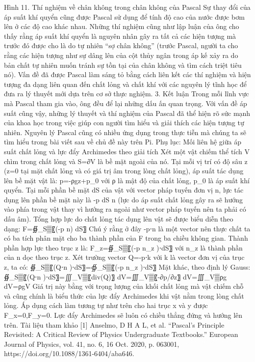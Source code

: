 \begin{multicols}{2}
	Hình 11. Thí nghiệm về chân không trong chân không của Pascal
	Sự thay đổi của áp suất khí quyển cũng được Pascal sử dụng để tính độ cao của nước được bơm lên ở các độ cao khác nhau. Những thí nghiệm cũng như lập luận của ông cho thấy rằng áp suất khí quyển là nguyên nhân gây ra tất cả các hiện tượng mà trước đó được cho là do tự nhiên “sợ chân không” (trước Pascal, người ta cho rằng các hiện tượng như sự dâng lên của cột thủy ngân trong áp kế xảy ra do bản chất tự nhiên muốn tránh sự tồn tại của chân không và tìm cách triệt tiêu nó). Vấn đề đã được Pascal làm sáng tỏ bằng cách liên kết các thí nghiệm và hiện tượng đa dạng liên quan đến chất lỏng và chất khí với các nguyên lý tĩnh học để đưa ra lý  thuyết mới dựa trên cơ sở thực nghiệm.
	3. Kết luận
	Trong mỗi lĩnh vực mà Pascal tham gia vào, ông đều để lại những dấu ấn quan trọng. Với vấn đề áp suất cũng vậy, những lý  thuyết và thí nghiệm của Pascal đã thể hiện rõ sức mạnh của khoa học trong việc giúp con người tìm hiểu và giải thích các hiện tượng tự nhiên. Nguyên lý Pascal cũng có nhiều ứng dụng trong thực tiễn mà chúng ta sẽ tìm hiểu trong bài viết sau về chủ đề này trên Pi.
	Phụ lục: Mối liên hệ giữa áp suất chất lỏng và lực đẩy Archimedes theo giải tích
	Xét một vật chiếm thể tích V chìm trong chất lỏng và S=∂V là bề mặt ngoài của nó. Tại mỗi vị trí có độ sâu z (z=0 tại mặt chất lỏng và có giá trị âm trong lòng chất lỏng), áp suất tác dụng lên bề mặt vật là:
	p=-ρgz+p_0
	với ρ là mật độ của chất lỏng, p_0 là áp suất khí quyển.
	Tại mỗi phần bề mặt dS của vật với vector pháp tuyến đơn vị n, lực tác dụng lên phần bề mặt này là -p dS n (lực do áp suất chất lỏng gây ra sẽ hướng vào phía trong vật thay vì hướng ra ngoài như vector pháp tuyến nên ta phải có dấu âm). Tổng hợp lực do chất lỏng tác dụng lên vật sẽ được biểu diễn theo dạng:
	F=∯_S▒〖(-p n)  dS〗
	Chú ý rằng ở đây -p⋅n là một vector nên thực chất ta có ba tích phân mặt cho ba thành phần của F trong ba chiều không gian.
	Thành phần hợp lực theo trục z là:
	F_z=∯_S▒〖(-p n_z  )⋅dS〗
	với n_z là thành phần của n dọc theo trục z.
	Xét trường vector Q=-p⋅k với k là vector đơn vị của trục z, ta có:
	∯_S▒〖(Q⋅n )⋅dS〗=∯_S▒〖(-p n_z  )⋅dS〗
	Mặt khác, theo định lý  Gauss:
	∯_S▒〖(Q⋅n )⋅dS〗=∭_V▒〖div(Q)〗 dV=∭_V▒〖-∂p/∂z〗 dV=∭_V▒ρg dV=ρgV
	Giá trị này bằng với trọng lượng của khối chất lỏng mà vật chiếm chỗ và cũng chính là biểu thức của lực đẩy Archimedes khi vật nằm trong lòng chất lỏng. Áp dụng cách làm tương tự như trên cho hai trục x và y được F_x=0,F_y=0. Lực đẩy Archimedes sẽ luôn có chiều thẳng đứng và hướng lên trên.
	Tài liệu tham khảo
	[1] Anselmo, D H A L, et al. “Pascal’s Principle Revisited: A Critical Review of Physics Undergraduate Textbooks.” European Journal of Physics, vol. 41, no. 6, 16 Oct. 2020, p. 063001, https://doi.org/10.1088/1361-6404/aba646.

\end{multicols}

